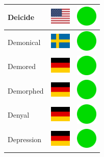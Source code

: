 \documentclass[12pt, a4paper, twoside]{report}
\begin{document}
\begin{center}
\begin{longtable}{|p{5cm}|p{2cm}|p{2cm}|}
Deicide & \includegraphics[width=1cm]{4x3/us} & \includegraphics[width=1cm]{likes/y} \\ \hline
Demonical & \includegraphics[width=1cm]{4x3/se} & \includegraphics[width=1cm]{likes/y} \\ \hline
Demored & \includegraphics[width=1cm]{4x3/de} & \includegraphics[width=1cm]{likes/y} \\ \hline
Demorphed & \includegraphics[width=1cm]{4x3/de} & \includegraphics[width=1cm]{likes/y} \\ \hline
Denyal & \includegraphics[width=1cm]{4x3/de} & \includegraphics[width=1cm]{likes/y} \\ \hline
Depression & \includegraphics[width=1cm]{4x3/de} & \includegraphics[width=1cm]{likes/y} \\ \hline

\end{longtable}
\end{center}
\end{document}
